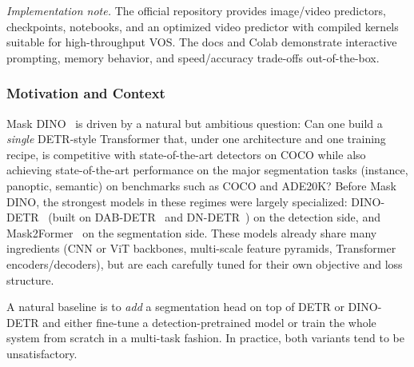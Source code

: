 \begin{enrichment}
\begin{enrichment}
		\bigskip
		\noindent\textit{Implementation note.} The official repository provides image/video predictors, checkpoints, notebooks, and an optimized video predictor with compiled kernels suitable for high-throughput VOS. The docs and Colab demonstrate interactive prompting, memory behavior, and speed/accuracy trade-offs out-of-the-box.
	
	\end{enrichment}
	
	\newpage
	
	\begin{enrichment}
		\label{enr:chapter15_maskdino}
		
		\subsubsection{Motivation and Context}
		\label{subsubsec:chapter15_maskdino_context}
		
		Mask DINO~\cite{li2022_maskdino} is driven by a natural but ambitious question: Can one build a \emph{single} DETR-style Transformer that, under one architecture and one training recipe, is competitive with state-of-the-art detectors on COCO while also achieving state-of-the-art performance on the major segmentation tasks (instance, panoptic, semantic) on benchmarks such as COCO and ADE20K? Before Mask DINO, the strongest models in these regimes were largely specialized: DINO-DETR~\cite{zhang2022_dino} (built on DAB-DETR~\cite{liu2022_dab_detr} and DN-DETR~\cite{li2022_dn_detr}) on the detection side, and Mask2Former~\cite{cheng2022_mask2former} on the segmentation side. These models already share many ingredients (CNN or ViT backbones, multi-scale feature pyramids, Transformer encoders/decoders), but are each carefully tuned for their own objective and loss structure.
		
		A natural baseline is to \emph{add} a segmentation head on top of DETR or DINO-DETR and either fine-tune a detection-pretrained model or train the whole system from scratch in a multi-task fashion. In practice, both variants tend to be unsatisfactory.
		

\end{enrichment}
\end{enrichment}

